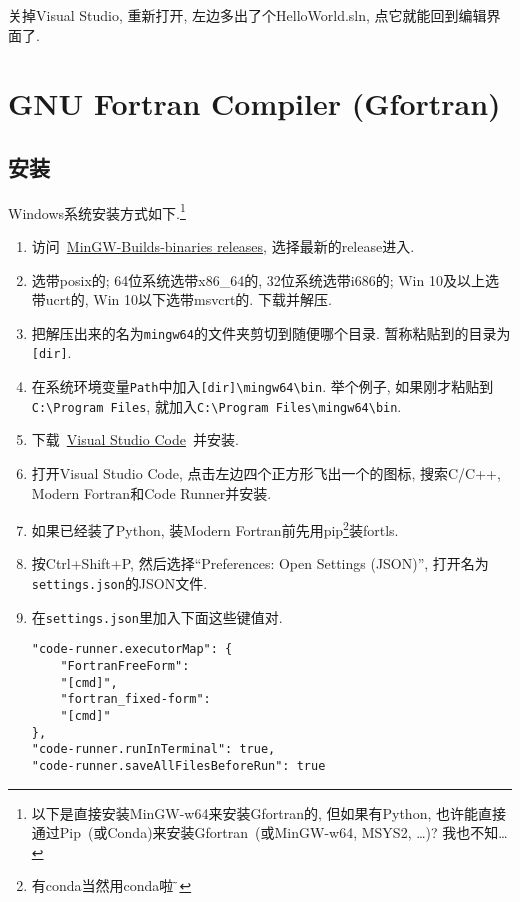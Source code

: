 关掉Visual Studio, 重新打开, 左边多出了个HelloWorld.sln, 点它就能回到编辑界面了.

\section[GNU Fortran Compiler]{GNU Fortran Compiler (Gfortran)}

\subsection{安装}

Windows系统安装方式如下.\footnote{
    以下是直接安装MinGW-w64来安装Gfortran的, 但如果有Python, 也许能直接通过Pip~(或Conda)来安装Gfortran~(或MinGW-w64, MSYS2, \dots)? 我也不知\dots
}
\begin{enumerate}
    \item 访问~\href{https://github.com/niXman/mingw-builds-binaries/releases}
    {MinGW-Builds-binaries releases}, 选择最新的release进入.
    \item 选带posix的; 64位系统选带x86\_64的, 32位系统选带i686的; Win 10及以上选带ucrt的, Win 10以下选带msvcrt的. 下载并解压.
    \item 把解压出来的名为\verb|mingw64|的文件夹剪切到随便哪个目录. 暂称粘贴到的目录为\verb|[dir]|.
    \item 在系统环境变量\verb|Path|中加入\verb|[dir]\mingw64\bin|. 举个例子, 如果刚才粘贴到\verb|C:\Program Files|, 就加入\verb|C:\Program Files\mingw64\bin|.
    \item 下载~\href{https://code.visualstudio.com/sha/download?build=stable&os=win32-x64-user}
    {Visual Studio Code}~并安装.
    \item 打开Visual Studio Code, 点击左边四个正方形飞出一个的图标, 搜索C/C++, Modern Fortran和Code Runner并安装.
    \item[] 如果已经装了Python, 装Modern Fortran前先用pip\footnote{有conda当然用conda啦$\!\text{\~{}}$}装fortls.
    \item 按Ctrl+Shift+P, 然后选择``Preferences: Open Settings (JSON)'', 打开名为\verb|settings.json|的JSON文件.
    \item 在\verb|settings.json|里加入下面这些键值对.
    \begin{lstlisting}
"code-runner.executorMap": {
    "FortranFreeForm":
    "[cmd]",
    "fortran_fixed-form":
    "[cmd]"
},
"code-runner.runInTerminal": true,
"code-runner.saveAllFilesBeforeRun": true
    \end{lstlisting}
\end{enumerate}

